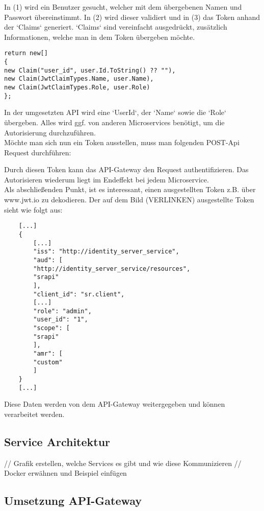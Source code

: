 In (1) wird ein Benutzer gesucht, welcher mit dem übergebenen Namen und Passwort übereinstimmt. In (2) wird dieser validiert und in (3) das Token anhand der `Claims` generiert. `Claims` sind vereinfacht ausgedrückt, zusätzlich Informationen, welche man in dem Token übergeben möchte. 

\begin{verbatim}
return new[]
{
new Claim("user_id", user.Id.ToString() ?? ""),
new Claim(JwtClaimTypes.Name, user.Name),
new Claim(JwtClaimTypes.Role, user.Role)
};
\end{verbatim}

In der umgesetzten API wird eine `UserId`, der `Name` sowie die `Role` übergeben. Alles wird ggf. von anderen Microservices benötigt, um die Autorisierung durchzuführen.\\

Möchte man sich nun ein Token ausstellen, muss man folgenden POST-Api Request durchführen: 

Durch diesen Token kann das API-Gateway den Request authentifizieren. Das Autorisieren wiederum liegt im Endeffekt bei jedem Microservice. \\

Als abschließenden Punkt, ist es interessant, einen ausgestellten Token z.B. über www.jwt.io zu dekodieren. Der auf dem Bild (VERLINKEN) ausgestellte Token sieht wie folgt aus:

\begin{verbatim}
	[...]
	{
		[...]
		"iss": "http://identity_server_service",
		"aud": [
		"http://identity_server_service/resources",
		"srapi"
		],
		"client_id": "sr.client",
		[...]
		"role": "admin",
		"user_id": "1",
		"scope": [
		"srapi"
		],
		"amr": [
		"custom"
		]
	}
	[...]
\end{verbatim}  

Diese Daten werden von dem API-Gateway weitergegeben und können verarbeitet werden. 

\subsection{Service Architektur}
// Grafik erstellen, welche Services es gibt und wie diese Kommunizieren 
// Docker erwähnen und Beispiel einfügen

\subsection{Umsetzung API-Gateway}\label{sec:umsetzung_api_gateway}

